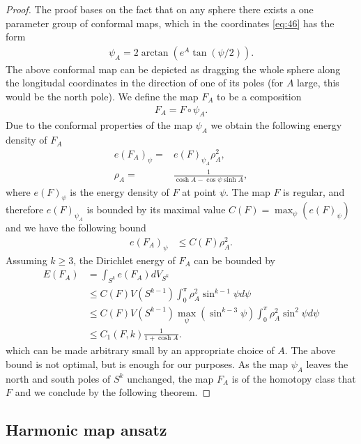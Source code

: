 \begin{proof}
  The proof bases on the fact that on any sphere there exists a one
  parameter group of conformal maps, which in the coordinates
  \eqref{eq:46} has the form
  \begin{align}
    \label{eq:10}
    \psi_A=2\arctan(e^A\tan(\psi/2)).
  \end{align}
  The above conformal map can be depicted as dragging the whole sphere
  along the longitudal coordinates in the direction of one of its poles
  (for $A$ large, this would be the north pole). We define the map $F_A$
  to be a composition
  \begin{align}
    \label{eq:11}
    F_A=F\circ\psi_A.
  \end{align}
  Due to the conformal properties of the map $\psi_A$ we obtain the
  following energy density of $F_A$
  \begin{align}
    \label{eq:12}
    e(F_A)_\psi=&e(F)_{\psi_A}\rho_A^2,\\
    \rho_A=&\frac{1}{\cosh A-\cos\psi\sinh A},
  \end{align}
  where $e(F)_\psi$ is the energy density of $F$ at point $\psi$.  The
  map $F$ is regular, and therefore $e(F)_{\psi_A}$ is bounded by its
  maximal value $C(F)=\max_\psi\left(e(F)_\psi\right)$ and we have the
  following bound
  \begin{align}
    \label{eq:13}
    e(F_A)_\psi&\le C(F)\rho_A^2.
  \end{align}
  Assuming $k\ge3$, the Dirichlet energy of $F_A$ can be bounded by
  \begin{align}
    \label{eq:14}
    E(F_A)&=\int_{S^k}e(F_A)dV_{S^k}\\
    &\le C(F)V(S^{k-1})\int_{0}^{\pi}\rho_A^2\sin^{k-1}\psi d\psi\\
    &\le C(F)V(S^{k-1})\max_\psi(\sin^{k-3}\psi)\int_{0}^{\pi}\rho_A^2\sin^2\psi d\psi\\
    &\le C_1(F,k)\frac{1}{1+\cosh A}.
  \end{align}
  which can be made arbitrary small by an appropriate choice of $A$. The
  above bound is not optimal, but is enough for our purposes. As the map
  $\psi_A$ leaves the north and south poles of $S^k$ unchanged, the map
  $F_A$ is of the homotopy class that $F$ and we conclude by the
  following theorem.

\end{proof}



\subsection{Harmonic map ansatz}
\label{sec:basic-setup}

